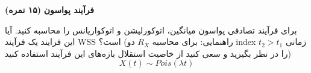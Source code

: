 \Large \textbf{فرآیند پواسون}
\large \textbf{(۱۵ نمره)}

\normalsize \vspace{0.5cm}
برای فرآیند تصادفی پواسون میانگین، اتوکورلیشن و اتوکواریانس را محاسبه کنید. آیا این فرایند یک فرآیند WSS است؟
(راهنمایی: برای محاسبه $ R_X $ دو index زمانی
$ t_2>t_1 $
 را در نظر بگیرید و سعی کنید از خاصیت استقلال بازه‌های این فرآیند استفاده کنید)
$$
 X(t) \sim Pois(\lambda t) 
$$